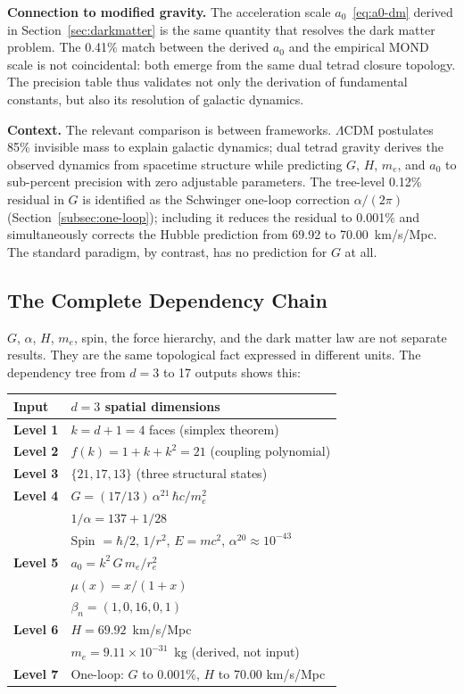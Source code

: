 \documentclass[aps,prd,preprint,superscriptaddress,showpacs,preprintnumbers,amsmath,amssymb,nofootinbib]{revtex4-2}
\begin{document}
\textbf{Connection to modified gravity.} The acceleration scale $a_0$~\eqref{eq:a0-dm} derived in Section~\ref{sec:darkmatter} is the same quantity that resolves the dark matter problem. The 0.41\% match between the derived $a_0$ and the empirical MOND scale is not coincidental: both emerge from the same dual tetrad closure topology. The precision table thus validates not only the derivation of fundamental constants, but also its resolution of galactic dynamics.

\textbf{Context.} The relevant comparison is between frameworks. $\Lambda$CDM postulates 85\% invisible mass to explain galactic dynamics; dual tetrad gravity derives the observed dynamics from spacetime structure while predicting $G$, $H$, $m_e$, and $a_0$ to sub-percent precision with zero adjustable parameters. The tree-level 0.12\% residual in $G$ is identified as the Schwinger one-loop correction $\alpha/(2\pi)$ (Section~\ref{subsec:one-loop}); including it reduces the residual to 0.001\% and simultaneously corrects the Hubble prediction from 69.92 to 70.00~km/s/Mpc. The standard paradigm, by contrast, has no prediction for $G$ at all.

\subsection{The Complete Dependency Chain}
\label{subsec:dependency}

$G$, $\alpha$, $H$, $m_e$, spin, the force hierarchy, and the dark matter law are not separate results. They are the same topological fact expressed in different units. The dependency tree from $d = 3$ to 17 outputs shows this:

\begin{center}
\renewcommand{\arraystretch}{1.3}
\begin{tabular}{@{}ll@{}}
\textbf{Input} & $d = 3$ spatial dimensions \\
\midrule
\textbf{Level 1} & $k = d + 1 = 4$ faces (simplex theorem) \\
\textbf{Level 2} & $f(k) = 1 + k + k^2 = 21$ (coupling polynomial) \\
\textbf{Level 3} & $\{21, 17, 13\}$ (three structural states) \\
\textbf{Level 4} & $G = (17/13)\,\alpha^{21}\,\hbar c/m_e^2$ \\
 & $1/\alpha = 137 + 1/28$ \\
 & Spin $= \hbar/2$, $1/r^2$, $E = mc^2$, $\alpha^{20} \approx 10^{-43}$ \\
\textbf{Level 5} & $a_0 = k^2\,G\,m_e/r_e^2$ \\
 & $\mu(x) = x/(1+x)$ \\
 & $\beta_n = (1, 0, 16, 0, 1)$ \\
\textbf{Level 6} & $H = 69.92$~km/s/Mpc \\
 & $m_e = 9.11 \times 10^{-31}$~kg (derived, not input) \\
\textbf{Level 7} & One-loop: $G$ to 0.001\%, $H$ to 70.00 km/s/Mpc \\
\end{tabular}
\end{center}
\end{document}

